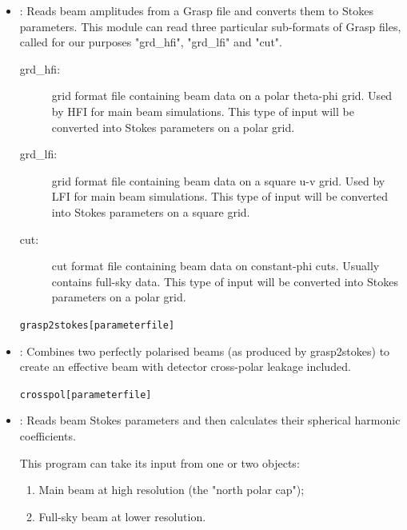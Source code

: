 \begin{itemize}

\item {}:
Reads beam amplitudes from a Grasp file and converts them to Stokes
parameters.  This module can read three particular sub-formats of
Grasp files, called for our purposes "grd\_hfi", "grd\_lfi" and "cut".

\begin{description}
\item[grd\_hfi:] grid format file containing beam data on a polar theta-phi
	 grid.  Used by HFI for main beam simulations.  This type of
	 input will be converted into Stokes parameters on a polar
	 grid.

\item[grd\_lfi:] grid format file containing beam data on a square u-v grid.
         Used by LFI for main beam simulations.  This type of input
         will be converted into Stokes parameters on a square grid.

\item[cut:] cut format file containing beam data on constant-phi
         cuts. Usually contains full-sky data.  This type of input
         will be converted into Stokes parameters on a polar grid.
\end{description}

\begin{alltt}
grasp2stokes [parameter file]


\end{alltt}

\item {}:
Combines two perfectly polarised beams (as produced by grasp2stokes)
to create an effective beam with detector cross-polar leakage
included.

\begin{alltt}
crosspol [parameter file]


\end{alltt}

\item {}:
Reads beam Stokes parameters and then calculates their spherical
harmonic coefficients.

This program can take its input from one or two objects:

\begin{enumerate}
 \item Main beam at high resolution (the "north polar cap");
 \item Full-sky beam at lower resolution.
\end{enumerate}


\end{itemize}
